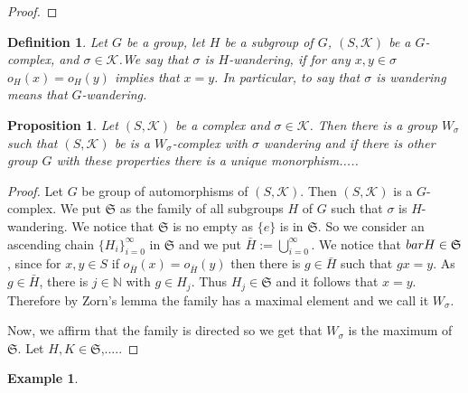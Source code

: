 \documentclass{amsart}
\newtheorem{proposition}{Proposition}[section]
\newtheorem{definition}{Definition}[section]
\newtheorem{example}{Example}[section]
\begin{document}
\begin{proof}

\end{proof}


\begin{definition}
Let $G$ be a group, let $H$ be a subgroup of $G$, $(S,\mathcal{K})$ be a $G$-complex, and $\sigma\in\mathcal{K}$.We say that $\sigma$ is $H$-wandering, if for any $x,y\in\sigma$ $o_H(x)=o_H(y)$ implies that $x=y$. In particular, to say that $\sigma$ is wandering means that $G$-wandering.
\end{definition}

\begin{proposition}
Let $(S,\mathcal{K})$ be a complex and $\sigma\in\mathcal{K}$. Then there is a group $W_\sigma$ such that  $(S,\mathcal{K})$ be is a $W_\sigma$-complex with $\sigma$ wandering and if there is other group $G$ with these properties there is a unique monorphism.....
\end{proposition}


\begin{proof}
Let $G$ be group of automorphisms of $(S,\mathcal{K})$. Then $(S,\mathcal{K})$ is a $G$-complex.  We put $\mathfrak{S}$ as the family of all subgroups $H$ of $G$ such that $\sigma$ is $H$-wandering. We notice that $\mathfrak{S}$ is no empty as $\{e\}$ is in $\mathfrak{S}$. So we consider an ascending chain $\{H_i\}_{i=0}^\infty$ in $\mathfrak{S}$ and we put $\bar{H}:=\bigcup_{i=0}^\infty$. We notice that $\\bar{H}\in \mathfrak{S}$, since for $x,y\in S$ if $o_{\bar{H}}(x)=o_{\bar{H}}(y)$ then there is $g\in \bar{H}$ such that $gx=y$. As $g\in\bar{H}$, there is $j\in\mathbb{N}$ with $g\in H_j$. Thus $H_j\in \mathfrak{S}$ and it follows that $x=y$. Therefore by Zorn's lemma the family has a maximal element and we call it $W_\sigma$. 

Now, we affirm that the family is directed so we get that $W_\sigma$ is the maximum of $\mathfrak{S}$. Let $H,K\in\mathfrak{S}$,.....


\end{proof}











\begin{example}

\end{example}
\end{document}
